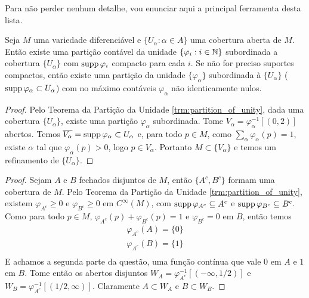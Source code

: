 Para não perder nenhum detalhe, vou enunciar aqui a principal ferramenta desta lista.
\begin{theorem}
    \label{trm:partition_of_unity}
    Seja $M$ uma variedade diferenciável e $\{U_\alpha: \alpha \in A\}$ uma cobertura aberta de $M$. Então existe uma partição contável da unidade
    $\{\varphi_i : i \in \mathbb{N}\}$ subordinada a cobertura $\{U_\alpha\}$ com $\operatorname{supp} \varphi_i$ compacto para cada $i$. Se não for preciso suportes compactos,
    então existe uma partição da unidade $\{\varphi_\alpha\}$ subordinada à $\{U_\alpha\}$ ($\operatorname{supp} \varphi_\alpha \subset U_\alpha$) com no máximo
    contáveis $\varphi_\alpha$ não identicamente nulos.
\end{theorem}

\begin{problem}
\label{prob:l1:2}   
\end{problem}

\begin{proof}
    Pelo Teorema da Partição da Unidade \ref{trm:partition_of_unity}, dada uma cobertura $\{U_\alpha\}$, existe uma partição $\varphi_\alpha$ subordinada.
    Tome $V_\alpha = \varphi_\alpha^{-1}[(0,2)]$ abertos. Temos $\overline{V_\alpha} = \operatorname{supp} \varphi_\alpha \subset U_\alpha$ e, para todo $p \in M$, como $\sum_\alpha \varphi_\alpha(p) = 1$,
    existe $\alpha$ tal que $\varphi_\alpha(p) > 0$, logo $p \in V_\alpha$. Portanto $M \subset \{V_\alpha\}$ e temos um refinamento de $\{U_\alpha\}$.
\end{proof}

\begin{problem}
\label{prob:l1:3}   
\end{problem}

\begin{proof}
    Sejam $A$ e $B$ fechados disjuntos de $M$, então $\{A^c, B^c\}$ formam uma cobertura de $M$. Pelo Teorema da Partição da Unidade \ref{trm:partition_of_unity}, existem
    $\varphi_{A^c} \geq 0$ e $\varphi_{B^c} \geq 0$ em $C^\infty(M)$, com $\operatorname{supp} \varphi_{A^c} \subseteq A^c$ e  $\operatorname{supp} \varphi_{B^c} \subseteq B^c$. Como para todo $p \in M$, $\varphi_{A^c}(p) + \varphi_{B^c}(p) = 1$
    e $\varphi_{B^c} = 0$ em $B$, então temos
    \begin{align*}
        \varphi_{A^c}(A) = \{0\}\\
        \varphi_{A^c}(B) = \{1\}\\
    \end{align*}
    E achamos a segunda parte da questão, uma função contínua que vale $0$ em $A$ e $1$ em $B$.
    Tome então os abertos disjuntos $W_A = \varphi_{A^c}^{-1}[(-\infty,1/2)]$ e $W_B =\varphi_{A^c}^{-1}[(1/2,\infty)]$. Claramente $A \subset W_A$ e $B \subset W_B$.
\end{proof}

